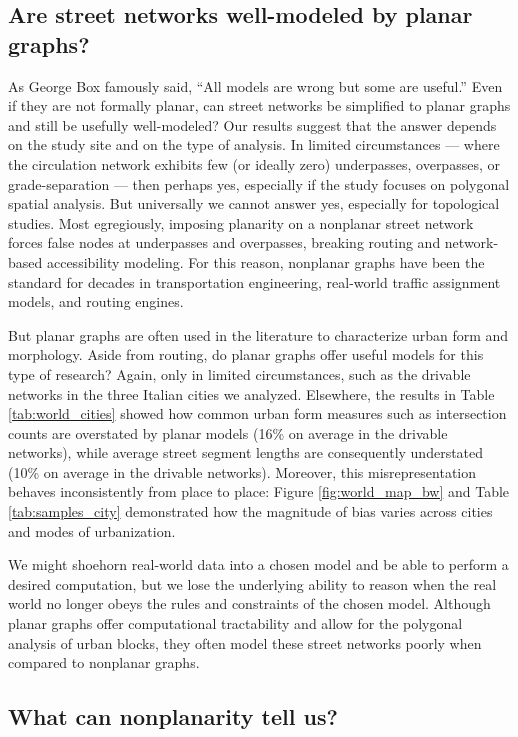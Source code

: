 \documentclass[Afour,sageh,times]{sagej}
\begin{document}
\subsection{Are street networks well-modeled by planar graphs?}

As George Box famously said, \enquote{All models are wrong but some are useful.} Even if they are not formally planar, can street networks be simplified to planar graphs and still be usefully well-modeled? Our results suggest that the answer depends on the study site and on the type of analysis. In limited circumstances --- where the circulation network exhibits few (or ideally zero) underpasses, overpasses, or grade-separation --- then perhaps yes, especially if the study focuses on polygonal spatial analysis. But universally we cannot answer yes, especially for topological studies. Most egregiously, imposing planarity on a nonplanar street network forces false nodes at underpasses and overpasses, breaking routing and network-based accessibility modeling. For this reason, nonplanar graphs have been the standard for decades in transportation engineering, real-world traffic assignment models, and routing engines.

But planar graphs are often used in the literature to characterize urban form and morphology. Aside from routing, do planar graphs offer useful models for this type of research? Again, only in limited circumstances, such as the drivable networks in the three Italian cities we analyzed. Elsewhere, the results in Table \ref{tab:world_cities} showed how common urban form measures such as intersection counts are overstated by planar models (16\% on average in the drivable networks), while average street segment lengths are consequently understated (10\% on average in the drivable networks). Moreover, this misrepresentation behaves inconsistently from place to place: Figure \ref{fig:world_map_bw} and Table \ref{tab:samples_city} demonstrated how the magnitude of bias varies across cities and modes of urbanization.

We might shoehorn real-world data into a chosen model and be able to perform a desired computation, but we lose the underlying ability to reason when the real world no longer obeys the rules and constraints of the chosen model. Although planar graphs offer computational tractability and allow for the polygonal analysis of urban blocks, they often model these street networks poorly when compared to nonplanar graphs.


\subsection{What can nonplanarity tell us?}
\end{document}
